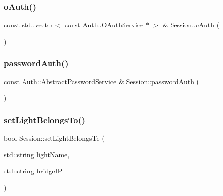 \mbox{\label{class_session_a22252a55fec95eec790ca74ce9559a54}} 
\subsubsection{\texorpdfstring{o\+Auth()}{oAuth()}}
{\footnotesize\ttfamily const std\+::vector$<$ const Auth\+::\+O\+Auth\+Service $\ast$ $>$ \& Session\+::o\+Auth (\begin{DoxyParamCaption}{ }\end{DoxyParamCaption})\hspace{0.3cm}{\ttfamily [static]}}

\mbox{\label{class_session_a06fdfd453428ecbe0e1cce81470bca69}} 
\subsubsection{\texorpdfstring{password\+Auth()}{passwordAuth()}}
{\footnotesize\ttfamily const Auth\+::\+Abstract\+Password\+Service \& Session\+::password\+Auth (\begin{DoxyParamCaption}{ }\end{DoxyParamCaption})\hspace{0.3cm}{\ttfamily [static]}}

\mbox{\label{class_session_a4670d4ae1102848d8e64d634f54946d3}} 
\subsubsection{\texorpdfstring{set\+Light\+Belongs\+To()}{setLightBelongsTo()}}
{\footnotesize\ttfamily bool Session\+::set\+Light\+Belongs\+To (\begin{DoxyParamCaption}\item[{std\+::string}]{light\+Name,  }\item[{std\+::string}]{bridge\+IP }\end{DoxyParamCaption})}

\mbox{\label{class_session_aa40d013373490cddefcfb4904dfc3e81}} 
